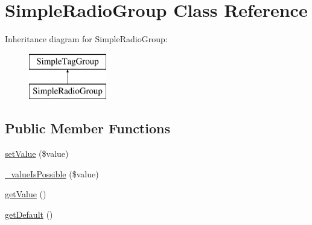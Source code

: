 \hypertarget{class_simple_radio_group}{
\section{SimpleRadioGroup Class Reference}
\label{class_simple_radio_group}
}
Inheritance diagram for SimpleRadioGroup:\begin{figure}[H]
\begin{center}
\leavevmode
\includegraphics[height=2.000000cm]{class_simple_radio_group}
\end{center}
\end{figure}
\subsection*{Public Member Functions}
\begin{DoxyCompactItemize}
\item 
\hyperlink{class_simple_radio_group_a013490f1ead7db2b42af159ac71a1272}{setValue} (\$value)
\item 
\hyperlink{class_simple_radio_group_a810f7be694c8ebec2b72308d062fb567}{\_\-valueIsPossible} (\$value)
\item 
\hyperlink{class_simple_radio_group_a4fe55d05e9df72bc09ef03b05532520e}{getValue} ()
\item 
\hyperlink{class_simple_radio_group_a2cf7703fd1d0a439a63fff94f18ea5c8}{getDefault} ()
\end{DoxyCompactItemize}


